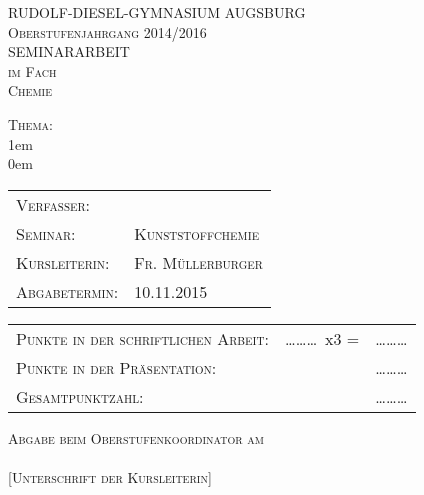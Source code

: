 \thispagestyle{empty}

\newcommand{\subject}{Chemie}
\newcommand{\topic}{}
\newcommand{\writer}{}
\newcommand{\seminar}{Kunststoffchemie}
\newcommand{\supervisor}{Fr. Müllerburger}
\newcommand{\deadline}{10.11.2015}

\newcommand{\ninedots}{\ldots\ldots\ldots}

\begin{center}

\textsc{\LARGE RUDOLF-DIESEL-GYMNASIUM AUGSBURG}\\[0.5cm]
\textsc{\Large Oberstufenjahrgang 2014/2016}\\[2cm]

\textsc{\LARGE SEMINARARBEIT}\\[0.25cm]
\textsc{\Large im Fach}\\[0.25cm]
\textsc{\LARGE \subject}\\[2cm]

\end{center}

\begin{flushleft}

\textsc{\Large Thema:}\\[0.25cm]
\leftskip1em
\textsc{\Large \topic}\\[2cm]
\leftskip0em

\begin{tabular}{ll}
\textsc{\Large Verfasser:} & \textsc{\Large \writer}\\[0.25cm]
\textsc{\Large Seminar:} & \textsc{\Large \seminar}\\[0.25cm]
\textsc{\Large Kursleiterin:} & \textsc{\Large \supervisor}\\[0.25cm]
\textsc{\Large Abgabetermin:} & \textsc{\Large \deadline}\\[2cm]
\end{tabular}

\begin{tabular}{lll}
\textsc{\Large Punkte in der schriftlichen Arbeit:} & \ninedots~x3 = & \ninedots \\[0.25cm]
\textsc{\Large Punkte in der Präsentation:} & & \ninedots \\[0.25cm]
\textsc{\Large Gesamtpunktzahl:} & & \ninedots \\[2cm]
\end{tabular}

\textsc{\Large Abgabe beim Oberstufenkoordinator am \dotfill}\\[2cm]

\textsc{\Large \dotfill}\\
\textsc{[Unterschrift der Kursleiterin]}

\end{flushleft}